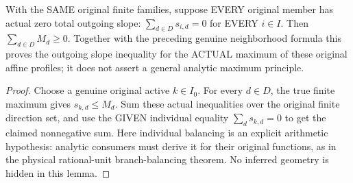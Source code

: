\begin{theorem}
\label{analysis:actual-active-max-slope-sum}
With the SAME original finite families, suppose EVERY original member has
actual zero total outgoing slope: $\sum_{d\in D}s_{i,d}=0$ for EVERY $i\in I$.
Then $\sum_{d\in D}M_d\geq0$.
Together with the preceding genuine neighborhood formula this proves the
outgoing slope inequality for the ACTUAL maximum of these original affine
profiles; it does not assert a general analytic maximum principle.
\leanok
\end{theorem}
\begin{proof}
Choose a genuine original active $k\in I_0$. For every $d\in D$, the true
finite maximum gives $s_{k,d}\leq M_d$. Sum these actual inequalities over
the original finite direction set, and use the GIVEN individual equality
$\sum_ds_{k,d}=0$ to get the claimed nonnegative sum. Here individual
balancing is an explicit arithmetic hypothesis: analytic consumers must
derive it for their original functions, as in the physical rational-unit
branch-balancing theorem. No inferred geometry is hidden in this lemma.
\end{proof}
